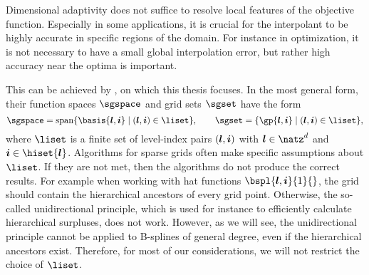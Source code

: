 Dimensional adaptivity does not suffice to resolve local features of the
objective function.
Especially in some applications, it is crucial for the
interpolant to be highly accurate in specific regions of the domain.
For instance in optimization, it is not necessary to have a small global
interpolation error, but rather high accuracy near the optima is important.

This can be achieved by ,
on which this thesis focuses.
In the most general form, their function spaces $\sgspace$
and grid sets $\sgset$ have the form
\begin{equation}
  \sgspace
  = \spn\{\basis{\*l,\*i} \mid (\*l,\*i) \in \liset\},\qquad
  \sgset
  = \{\gp{\*l,\*i} \mid (\*l,\*i) \in \liset\},
\end{equation}
where $\liset$ is a finite set of level-index pairs $({\boldsymbol{l}},{\boldsymbol{i}})$
with $\*l \in \natz^d$ and $\*i \in \hiset{\*l}$.
Algorithms for sparse grids often make specific assumptions about $\liset$.
If they are not met, then the algorithms do not produce the correct results.
For example when working with hat functions $\bspl{\*l,\*i}{1}{}$,
the grid should contain the hierarchical ancestors of every grid point.
Otherwise, the so-called
unidirectional principle, which is used for instance to efficiently calculate
hierarchical surpluses, does not work.
However, as we will see, the unidirectional principle cannot be applied
to B-splines of general degree, even if the hierarchical ancestors exist.
Therefore, for most of our considerations, we will not restrict the
choice of $\liset$.

